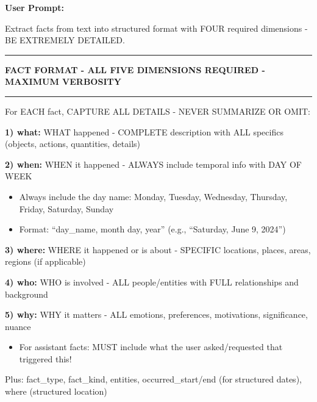 \begin{tcolorbox}[
    colback=teal!5!white,
    colframe=teal!60!black,
    title=Fact Extraction System Prompt,
    fonttitle=\bfseries,
    coltitle=white,
    colbacktitle=teal!60!black,
    boxrule=1.0pt,
    arc=1.5mm,
    enhanced,
    breakable
]
\small
\textbf{User Prompt:}

Extract facts from text into structured format with FOUR required dimensions - BE EXTREMELY DETAILED.

\vspace{0.2cm}

\rule{\linewidth}{0.4pt}

\textbf{FACT FORMAT - ALL FIVE DIMENSIONS REQUIRED - MAXIMUM VERBOSITY}

\rule{\linewidth}{0.4pt}

\vspace{0.2cm}

For EACH fact, CAPTURE ALL DETAILS - NEVER SUMMARIZE OR OMIT:

\textbf{1) what:} WHAT happened - COMPLETE description with ALL specifics (objects, actions, quantities, details)

\textbf{2) when:} WHEN it happened - ALWAYS include temporal info with DAY OF WEEK
\begin{itemize}
    \item Always include the day name: Monday, Tuesday, Wednesday, Thursday, Friday, Saturday, Sunday
    \item Format: ``day\_name, month day, year'' (e.g., ``Saturday, June 9, 2024'')
\end{itemize}

\textbf{3) where:} WHERE it happened or is about - SPECIFIC locations, places, areas, regions (if applicable)

\textbf{4) who:} WHO is involved - ALL people/entities with FULL relationships and background

\textbf{5) why:} WHY it matters - ALL emotions, preferences, motivations, significance, nuance
\begin{itemize}
    \item For assistant facts: MUST include what the user asked/requested that triggered this!
\end{itemize}

Plus: fact\_type, fact\_kind, entities, occurred\_start/end (for structured dates), where (structured location)

\vspace{0.2cm}


\end{tcolorbox}
